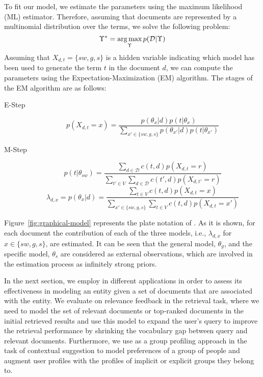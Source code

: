 To fit our model, we estimate the parameters using the maximum likelihood (ML) estimator. Therefore, assuming that documents are represented by a multinomial distribution over the terms, we solve the following problem:
\begin{equation}
\Upsilon^* = \operatorname*{arg\,max}_\Upsilon p(\mathcal{D}|\Upsilon)
\end{equation}
Assuming that $X_{d,t} = \{{sw},g,s\}$ is a hidden variable indicating which model has been used to generate the term $t$ in the document $d$, we can compute the parameters using the Expectation-Maximization (EM) algorithm. 
The stages of the EM algorithm are as follows:
\begin{description}
\item[E-Step]
\begin{equation}
p(X_{d,t} = x) = \frac{p(\theta_x|d)p(t|\theta_x)}{\sum_{x' \in \{sw,g,s\}}p(\theta_{x'}|d)p(t|\theta_{x'})}
\label{EM_e}
\end{equation}
\item[M-Step]
\begin{equation}
p(t|\theta_{sw}) = 
\frac{\sum_{d \in \mathcal{D}}c(t,d) p(X_{d,t} = r)}{\sum_{t' \in V}\sum_{d \in \mathcal{D}}c(t',d) p(X_{d,t'} = r)}
\label{EM_m1}
\end{equation}
\begin{equation}
\lambda_{d,x}  = p(\theta_x|d) = 
\frac{\sum_{t \in V}c(t,d) p(X_{d,t} = x)}{\sum_{x' \in \{sw,g,s\}}\sum_{t \in V}c(t,d) p(X_{d,t} = x')}
\label{EM_m2}
\end{equation}
\end{description}


Figure~\ref{fig:graphical-model} represents the plate notation of \acswlm. As it is shown, for each document the contribution of each of the three models, i.e., $\lambda_{d,x}$ for $x \in \{sw,g,s\}$, are estimated. It can be seen that the general model, $\theta_g$, and the specific model, $\theta_s$ are considered as external observations, which are involved in the estimation process as infinitely strong priors. 

In the next section, we employ \acswlm in different applications in order to assess its effectiveness in modeling an entity given a set of documents that are associated with the entity. We evaluate \acswlm on relevance feedback in the retrieval task, where we need to model the set of relevant documents or top-ranked documents in the initial retrieved results and use this model to expand the user's query to improve the retrieval performance by shrinking the vocabulary gap between query and relevant documents. Furthermore, we use \acswlm as a group profiling approach in the task of contextual suggestion to model preferences of a group of people and augment user profiles with the profiles of implicit or explicit groups they belong to.